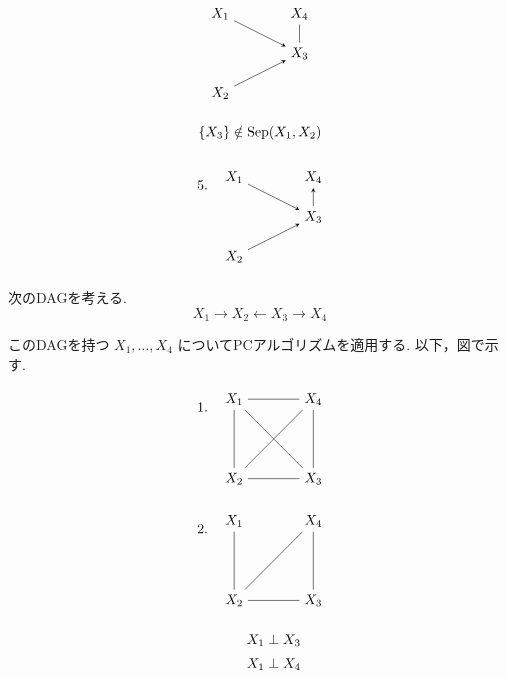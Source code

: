\documentclass[uplatex, dvipdfmx]{jsarticle}
\begin{document}
\begin{exm}{}
\[\begin{tikzpicture}[>=stealth, node distance=1.7cm]
      \node (X1) at (0,1) {$X_1$};
      \node (X2) at (0,-1) {$X_2$};
      \node (X3) at (2,0) {$X_3$};
      \node (X4) at (2,1) {$X_4$};

      \draw[->] (X1) -- (X3);
      \draw[->] (X2) -- (X3);
      \draw[-] (X3) -- (X4);

      \node at (1,-2) {$\{X_3\}\notin \mathrm{Sep}(X_1,X_2)$};
    \end{tikzpicture}
  \]

  \[
    \begin{tikzpicture}[>=stealth, node distance=1.7cm]
      \node at (-0.8,0.8) {$5.$};

      \node (X1) at (0,1) {$X_1$};
      \node (X2) at (0,-1) {$X_2$};
      \node (X3) at (2,0) {$X_3$};
      \node (X4) at (2,1) {$X_4$};

      \draw[->] (X1) -- (X3);
      \draw[->] (X2) -- (X3);
      \draw[->] (X3) -- (X4);
    \end{tikzpicture}
  \]

  次のDAGを考える.
  \[
    X_1\to X_2\leftarrow X_3\to X_4
  \]

  このDAGを持つ $X_1,\ldots,X_4$ についてPCアルゴリズムを適用する.
  以下，図で示す.

  \[
    \begin{tikzpicture}[>=stealth, node distance=1.7cm]
      \node at (-0.8,0.8) {$1.$};

      \node (X1) at (0,1) {$X_1$};
      \node (X2) at (0,-1) {$X_2$};
      \node (X3) at (2,-1) {$X_3$};
      \node (X4) at (2,1) {$X_4$};

      \draw[-] (X1) -- (X2);
      \draw[-] (X1) -- (X3);
      \draw[-] (X1) -- (X4);
      \draw[-] (X2) -- (X3);
      \draw[-] (X2) -- (X4);
      \draw[-] (X3) -- (X4);
    \end{tikzpicture}
  \]

  \[
    \begin{tikzpicture}[>=stealth, node distance=1.7cm]
      \node at (-0.8,0.8) {$2.$};

      \node (X1) at (0,1) {$X_1$};
      \node (X2) at (0,-1) {$X_2$};
      \node (X3) at (2,-1) {$X_3$};
      \node (X4) at (2,1) {$X_4$};

      \draw[-] (X1) -- (X2);
      \draw[-] (X2) -- (X3);
      \draw[-] (X3) -- (X4);
      \draw[-] (X2) -- (X4);

      \node at (1,-2) {$X_1\perp X_3$};
      \node at (1,-2.6) {$X_1\perp X_4$};
    \end{tikzpicture}
  \]


\end{exm}
\end{document}
